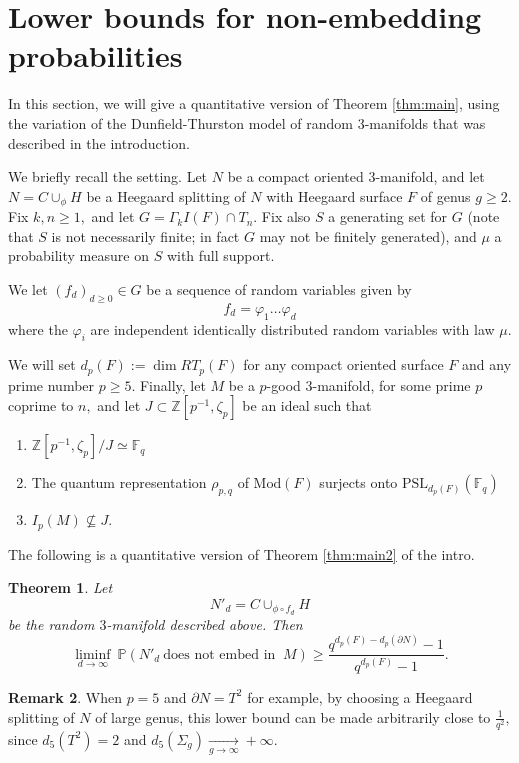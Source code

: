 \documentclass[12pt]{amsart}
\newtheorem{thm}{Theorem}[section]
\theoremstyle{definition}
\newtheorem{rem}[thm]{Remark}
\newcommand{\Z}{\mathbb{Z}}
\begin{document}
\section{Lower bounds for non-embedding probabilities}
\label{sec:proba}
In this section, we will give a quantitative version of Theorem \ref{thm:main}, using the variation of the Dunfield-Thurston model of random $3$-manifolds that was described in the introduction.

We briefly recall the setting. Let $N$ be a compact oriented $3$-manifold, and let $N=C\cup_\phi H$ be a Heegaard splitting of $N$ with Heegaard surface $F$ of genus $g\geq 2.$ Fix $k,n\geq 1,$ and let $G=\Gamma_k I(F)\cap T_n.$ Fix also $S$ a generating set for $G$ (note that $S$ is not necessarily finite; in fact $G$ may not be finitely generated), and $\mu$ a probability measure on $S$ with full support.

We let $(f_d)_{d\geq 0}\in G$ be a sequence of random variables given by
$$f_d=\varphi_1\ldots \varphi_d$$
where the $\varphi_i$ are independent identically distributed random variables with law $\mu.$

We will set $d_p(F):=\dim RT_p(F)$ for any compact oriented surface $F$ and any prime number $p\geq 5.$
Finally, let $M$ be a $p$-good $3$-manifold, for some prime $p$ coprime to $n,$ and let $J\subset \Z[p^{-1},\zeta_p]$ be an ideal such that
\begin{enumerate}
	\item $\Z[p^{-1},\zeta_p]/J\simeq \mathbb{F}_q$
	\item The quantum representation $\rho_{p,q}$ of $\mathrm{Mod}(F)$ surjects onto $\mathrm{PSL}_{d_p(F)}(\mathbb{F}_q)$
	\item $I_p(M)\nsubseteq J.$
\end{enumerate}

 The following is a quantitative version of Theorem \ref{thm:main2} of the intro.
\begin{thm}
	\label{thm:proba} Let $$N'_d=C\cup_{\phi\circ f_d}H$$ be the random $3$-manifold described above. Then 
	$$\underset{d\rightarrow\infty}{\liminf} \ \mathbb{P}(N'_d \ \textrm{does not embed in } \ M)\geq \frac{q^{d_p(F)-d_p(\partial N)}-1}{q^{d_p(F)}-1}.$$
\end{thm}
\begin{rem}\label{rk:lowerBound}
	When $p=5$ and $\partial N=T^2$ for example, by choosing a Heegaard splitting of $N$ of large genus, this lower bound can be made arbitrarily close to $\frac{1}{q^2},$ since $d_5(T^2)=2$ and $d_5(\Sigma_g)\underset{g\rightarrow \infty}{\longrightarrow}+\infty.$
\end{rem}
\end{document}
